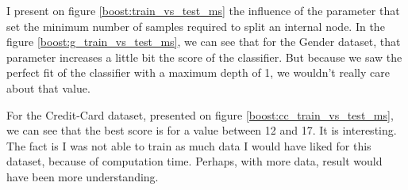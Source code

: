 \documentclass[10pt]{article}
\begin{document}
			I present on figure \ref{boost:train_vs_test_ms} the influence of the parameter that set the minimum number of samples required to split an internal node.
			In the figure \ref{boost:g_train_vs_test_ms}, we can see that for the Gender dataset, that parameter increases a little bit the score of the classifier. But because we saw the perfect fit of the classifier with a maximum depth of 1, we wouldn't really care about that value.

			For the Credit-Card dataset, presented on figure \ref{boost:cc_train_vs_test_ms}, we can see that the best score is for a value between 12 and 17. It is interesting. The fact is I was not able to train as much data I would have liked for this dataset, because of computation time. Perhaps, with more data, result would have been more understanding.
\end{document}
